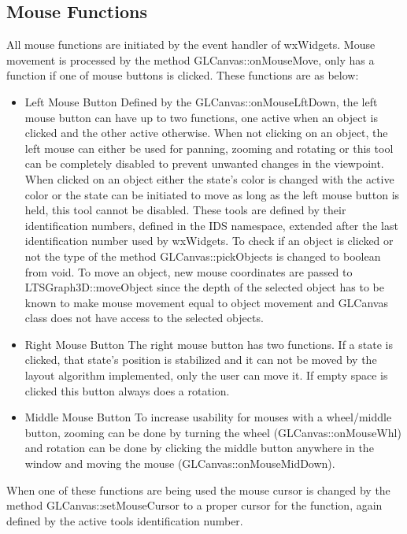 \documentclass[a4paper]{article}
\begin{document}
\subsection{Mouse Functions}
All mouse functions are initiated by the event handler of wxWidgets. Mouse movement is processed by the method GLCanvas::onMouseMove, only has a function if one of mouse buttons is clicked. These functions are as below:
\begin{itemize}
	\item{Left Mouse Button} \newline
	Defined by the GLCanvas::onMouseLftDown, the left mouse button can have up to two functions, one active when an object is clicked and the other active otherwise. When not clicking on an object, the left mouse can either be used for panning, zooming and rotating or this tool can be completely disabled to prevent unwanted changes in the viewpoint. When clicked on an object either the state's color is changed with the active color or the state can be initiated to move as long as the left mouse button is held, this tool cannot be disabled. These tools are defined by their identification numbers, defined in the IDS namespace, extended after the last identification number used by wxWidgets. To check if an object is clicked or not the type of the method GLCanvas::pickObjects is changed to boolean from void. To move an object, new mouse coordinates are passed to LTSGraph3D::moveObject since the depth of the selected object has to be known to make mouse movement equal to object movement and GLCanvas class does not have access to the selected objects.
	\item{Right Mouse Button} \newline
	The right mouse button has two functions. If a state is clicked, that state's position is stabilized and it can not be moved by the layout algorithm implemented, only the user can move it. If empty space is clicked this button always does a rotation.
	\item{Middle Mouse Button} \newline
	To increase usability for mouses with a wheel/middle button, zooming can be done by turning the wheel (GLCanvas::onMouseWhl) and rotation can be done by clicking the middle button anywhere in the window and moving the mouse (GLCanvas::onMouseMidDown).
\end{itemize}
When one of these functions are being used the mouse cursor is changed by the method GLCanvas::setMouseCursor to a proper cursor for the function, again defined by the active tools identification number.
\end{document}
